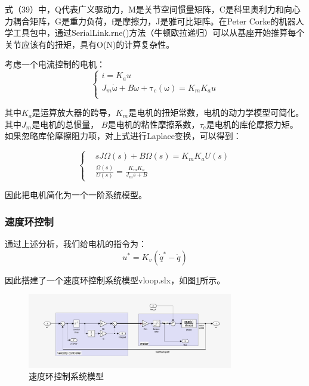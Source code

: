 式（39）中，Q代表广义驱动力，M是关节空间惯量矩阵，C是科里奥利力和向心力耦合矩阵，G是重力负荷，f是摩擦力，J是雅可比矩阵。在Peter Corke的机器人学工具包中，通过SerialLink.rne()方法（牛顿欧拉递归）可以从基座开始推算每个关节应该有的扭矩，具有O(N)的计算复杂性。

考虑一个电流控制的电机：
\begin{equation}
    \left\{ \begin{array}{c}	i=K_au\\	J_m\dot{\mathrm{\omega}}+B\omega +\mathrm{\tau}_c\left( \mathrm{\omega} \right) =K_mK_au\\\end{array} \right.
\end{equation}

其中$K_a$是运算放大器的跨导，$K_m$是电机的扭矩常数，电机的动力学模型可简化。其中$J_m$是电机的总惯量， $B$是电机的粘性摩擦系数，$\tau_c$是电机的库伦摩擦力矩。如果忽略库伦摩擦阻力项，对上式进行Laplace变换，可以得到：

\begin{equation}
    \left\{
        \begin{aligned}
            &sJ\Omega(s) + B\Omega(s)=K_mK_aU(s) \\
            &\frac{\Omega\left( s \right)}{U\left( s \right)}=\frac{K_mK_a}{J_ms+B}
        \end{aligned}
    \right.
\end{equation}

因此把电机简化为一个一阶系统模型。

\subsubsection{速度环控制}
通过上述分析，我们给电机的指令为：
\begin{equation}
    u^*=K_v(\dot{q}^*-\dot{q})
\end{equation}

因此搭建了一个速度环控制系统模型vloop.slx，如图\ref{fig:33}所示。

\begin{figure}[htbp]
    \centering
    \includegraphics[width=0.8\textwidth]{Image/vloop.png}
    \caption{速度环控制系统模型}
    \label{fig:33}
\end{figure}


